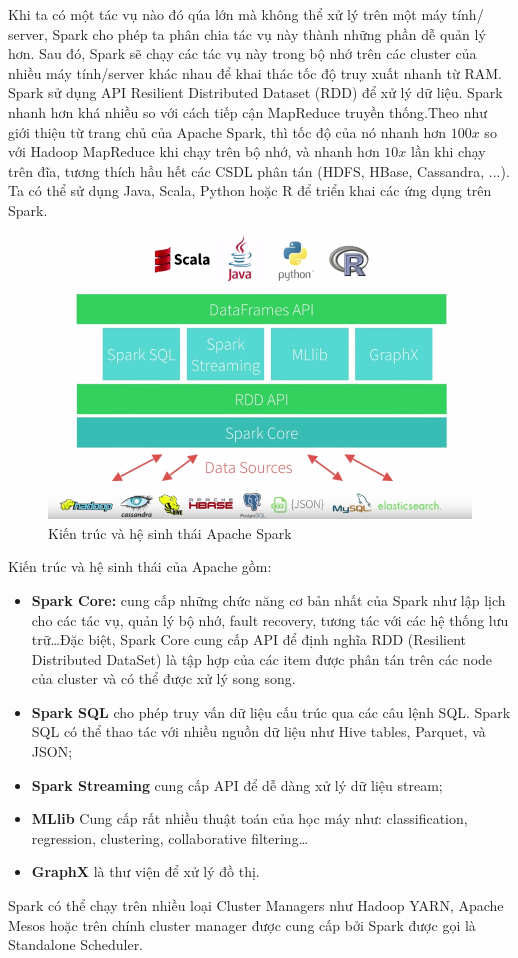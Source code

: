 Khi ta có một tác vụ nào đó qúa lớn mà không thể xử lý trên một máy tính/ server, Spark cho phép ta phân chia tác vụ này thành những phần dễ quản lý hơn. Sau đó, Spark sẽ chạy các tác vụ này trong bộ nhớ trên các cluster của nhiều máy tính/server khác nhau để khai thác tốc độ truy xuất nhanh từ RAM. Spark sử dụng API Resilient Distributed Dataset (RDD) để xử lý dữ liệu. Spark nhanh hơn khá nhiều so với cách tiếp cận MapReduce truyền thống.Theo như giới thiệu từ trang chủ của Apache Spark, thì tốc độ của nó nhanh hơn $100x$ so với Hadoop MapReduce khi chạy trên bộ nhớ, và nhanh hơn $10x$ lần khi chạy trên đĩa, tương thích hầu hết các CSDL phân tán (HDFS, HBase, Cassandra, ...). Ta có thể sử dụng Java, Scala, Python hoặc R để triển khai các ứng dụng trên Spark.
\begin{figure}[H]
	\centering
	\includegraphics[width=0.9\linewidth]{Chapter4/Chapter4Figs/sparkecosystems}
	\caption{Kiến trúc và hệ sinh thái Apache Spark}
	\label{fig:spark}
\end{figure}

Kiến trúc và hệ sinh thái của Apache gồm:
\begin{itemize}
	\item \textbf{Spark Core:} cung cấp những chức năng cơ bản nhất của Spark như lập lịch cho các tác vụ, quản lý bộ nhớ, fault recovery, tương tác với các hệ thống lưu trữ\dots Đặc biệt, Spark Core cung cấp API để định nghĩa RDD (Resilient Distributed DataSet) là tập hợp của các item được phân tán trên các node của cluster và có thể được xử lý song song.
	\item \textbf{Spark SQL} cho phép truy vấn dữ liệu cấu trúc qua các câu lệnh SQL. Spark SQL có thể thao tác với nhiều nguồn dữ liệu như Hive tables, Parquet, và JSON;
	\item \textbf{Spark Streaming} cung cấp API để dễ dàng xử lý dữ liệu stream;
	\item \textbf{MLlib} Cung cấp rất nhiều thuật toán của học máy như: classification, regression, clustering, collaborative filtering\dots
	\item \textbf{GraphX} là thư viện để xử lý đồ thị.
\end{itemize}
Spark có thể chạy trên nhiều loại Cluster Managers như Hadoop YARN, Apache Mesos hoặc trên chính cluster manager được cung cấp bởi Spark được gọi là Standalone Scheduler.

